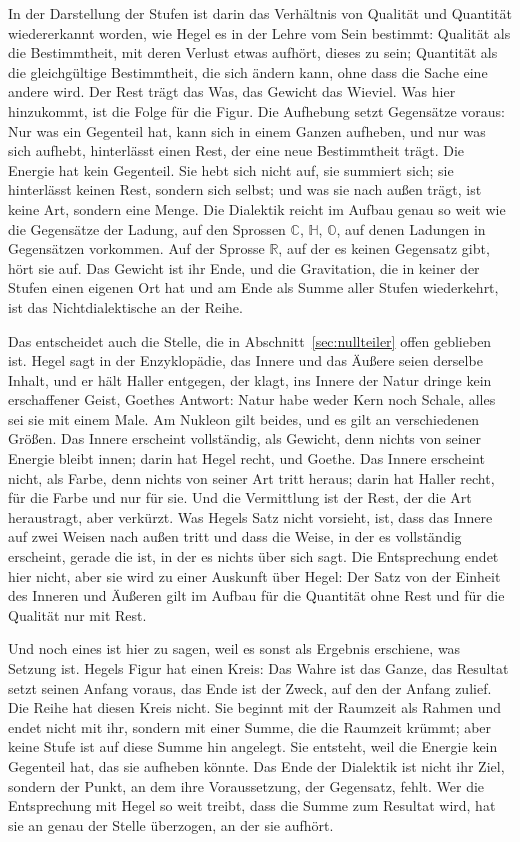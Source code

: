 \documentclass[11pt,a4paper]{article}
\newcommand{\Randlesart}{\marginpar{\raggedright\footnotesize\textcolor{lesart}{$\bigcirc$\,Lesart}}}
\newcommand{\R}{\mathbb R}
\newcommand{\C}{\mathbb C}
\newcommand{\HH}{\mathbb H}
\newcommand{\Oc}{\mathbb O}
\begin{document}
\Randlesart In der Darstellung der Stufen ist darin das Verhältnis von Qualität und Quantität wiedererkannt worden, wie Hegel es in der Lehre vom Sein bestimmt: Qualität als die Bestimmtheit, mit deren Verlust etwas aufhört, dieses zu sein; Quantität als die gleichgültige Bestimmtheit, die sich ändern kann, ohne dass die Sache eine andere wird. Der Rest trägt das Was, das Gewicht das Wieviel. Was hier hinzukommt, ist die Folge für die Figur. Die Aufhebung setzt Gegensätze voraus: Nur was ein Gegenteil hat, kann sich in einem Ganzen aufheben, und nur was sich aufhebt, hinterlässt einen Rest, der eine neue Bestimmtheit trägt. Die Energie hat kein Gegenteil. Sie hebt sich nicht auf, sie summiert sich; sie hinterlässt keinen Rest, sondern sich selbst; und was sie nach außen trägt, ist keine Art, sondern eine Menge. Die Dialektik reicht im Aufbau genau so weit wie die Gegensätze der Ladung, auf den Sprossen $\C$, $\HH$, $\Oc$, auf denen Ladungen in Gegensätzen vorkommen. Auf der Sprosse $\R$, auf der es keinen Gegensatz gibt, hört sie auf. Das Gewicht ist ihr Ende, und die Gravitation, die in keiner der Stufen einen eigenen Ort hat und am Ende als Summe aller Stufen wiederkehrt, ist das Nichtdialektische an der Reihe.

Das entscheidet auch die Stelle, die in Abschnitt~\ref{sec:nullteiler} offen geblieben ist. Hegel sagt in der Enzyklopädie, das Innere und das Äußere seien derselbe Inhalt, und er hält Haller entgegen, der klagt, ins Innere der Natur dringe kein erschaffener Geist, Goethes Antwort: Natur habe weder Kern noch Schale, alles sei sie mit einem Male. Am Nukleon gilt beides, und es gilt an verschiedenen Größen. Das Innere erscheint vollständig, als Gewicht, denn nichts von seiner Energie bleibt innen; darin hat Hegel recht, und Goethe. Das Innere erscheint nicht, als Farbe, denn nichts von seiner Art tritt heraus; darin hat Haller recht, für die Farbe und nur für sie. Und die Vermittlung ist der Rest, der die Art heraustragt, aber verkürzt. Was Hegels Satz nicht vorsieht, ist, dass das Innere auf zwei Weisen nach außen tritt und dass die Weise, in der es vollständig erscheint, gerade die ist, in der es nichts über sich sagt. Die Entsprechung endet hier nicht, aber sie wird zu einer Auskunft über Hegel: Der Satz von der Einheit des Inneren und Äußeren gilt im Aufbau für die Quantität ohne Rest und für die Qualität nur mit Rest.

Und noch eines ist hier zu sagen, weil es sonst als Ergebnis erschiene, was Setzung ist. Hegels Figur hat einen Kreis: Das Wahre ist das Ganze, das Resultat setzt seinen Anfang voraus, das Ende ist der Zweck, auf den der Anfang zulief. Die Reihe hat diesen Kreis nicht. Sie beginnt mit der Raumzeit als Rahmen und endet nicht mit ihr, sondern mit einer Summe, die die Raumzeit krümmt; aber keine Stufe ist auf diese Summe hin angelegt. Sie entsteht, weil die Energie kein Gegenteil hat, das sie aufheben könnte. Das Ende der Dialektik ist nicht ihr Ziel, sondern der Punkt, an dem ihre Voraussetzung, der Gegensatz, fehlt. Wer die Entsprechung mit Hegel so weit treibt, dass die Summe zum Resultat wird, hat sie an genau der Stelle überzogen, an der sie aufhört.
\end{document}
